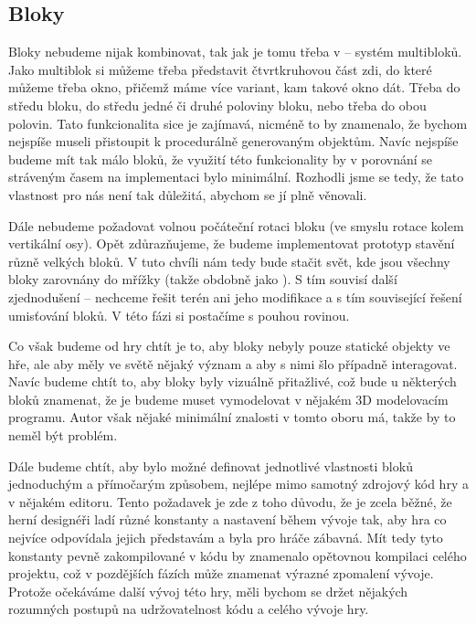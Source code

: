 
\subsection{Bloky}

 Bloky nebudeme nijak kombinovat, tak jak je tomu třeba v \ME{} -- systém multibloků. Jako multiblok si můžeme třeba představit čtvrtkruhovou část zdi, do které můžeme  třeba okno, přičemž máme více variant, kam takové okno dát. Třeba do středu bloku, do středu jedné či druhé poloviny bloku, nebo třeba do obou polovin. Tato funkcionalita sice je zajímavá, nicméně to by znamenalo, že bychom nejspíše museli přistoupit k procedurálně generovaným objektům. Navíc nejspíše budeme mít tak málo bloků, že využití této funkcionality by v porovnání se stráveným časem na implementaci bylo minimální. Rozhodli jsme se tedy, že tato vlastnost pro nás není tak důležitá, abychom se jí plně věnovali. 

Dále nebudeme požadovat volnou počáteční rotaci bloku (ve smyslu rotace kolem vertikální osy). Opět zdůrazňujeme, že budeme implementovat prototyp stavění různě velkých bloků. V tuto chvíli nám tedy bude stačit svět, kde jsou všechny bloky zarovnány do mřížky (takže obdobně jako \MC{}). S tím souvisí další zjednodušení -- nechceme řešit terén ani jeho modifikace a s tím související řešení umisťování bloků. V této fázi si postačíme s pouhou rovinou.

Co však budeme od hry chtít je to, aby bloky nebyly pouze statické objekty ve hře, ale aby měly ve světě nějaký význam a aby s nimi šlo případně interagovat. Navíc budeme chtít to, aby bloky byly vizuálně přitažlivé, což bude u některých bloků znamenat, že je budeme muset vymodelovat v nějakém 3D modelovacím programu. Autor však nějaké minimální znalosti v tomto oboru má, takže by to neměl být problém.

Dále budeme chtít, aby bylo možné definovat jednotlivé vlastnosti bloků jednoduchým a přímočarým způsobem, nejlépe mimo samotný zdrojový kód hry a v nějakém editoru. Tento požadavek je zde z toho důvodu, že je zcela běžné, že herní designéři ladí různé konstanty a nastavení během vývoje tak, aby hra co nejvíce odpovídala jejich představám a byla pro hráče zábavná. Mít tedy tyto konstanty pevně zakompilované v kódu by znamenalo opětovnou kompilaci celého projektu, což v pozdějších fázích může znamenat výrazné zpomalení vývoje. Protože očekáváme další vývoj této hry, měli bychom se držet nějakých rozumných postupů na udržovatelnost kódu a celého vývoje hry.



